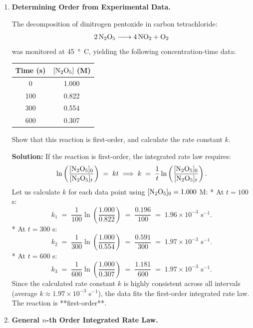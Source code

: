 \documentclass[12pt, a4paper]{book}
\begin{document}
\begin{problembox}
\begin{enumerate}[label=\textbf{E\arabic*.}]
  \item \textbf{Determining Order from Experimental Data.}
  
        The decomposition of dinitrogen pentoxide in carbon tetrachloride:
        \[
          \ce{2 N2O5 -> 4 NO2 + O2}
        \]
        was monitored at \SI{45}{\degree C}, yielding the following concentration-time data:
        \begin{center}
        \begin{tabular}{cc}
        \toprule
        \textbf{Time (s)} & \textbf{$[\ce{N2O5}]$ (M)} \\
        \midrule
        0 & 1.000 \\
        100 & 0.822 \\
        300 & 0.554 \\
        600 & 0.307 \\
        \bottomrule
        \end{tabular}
        \end{center}
        Show that this reaction is first-order, and calculate the rate constant $k$.
        
        \textbf{Solution:}
        If the reaction is first-order, the integrated rate law requires:
        \[
          \ln\left( \frac{[\ce{N2O5}]_0}{[\ce{N2O5}]_t} \right) \;=\; k t \implies k \;=\; \frac{1}{t} \ln\left( \frac{[\ce{N2O5}]_0}{[\ce{N2O5}]_t} \right).
        \]
        Let us calculate $k$ for each data point using $[\ce{N2O5}]_0 = 1.000$ M:
        * At $t = 100$ s:
        \[
          k_1 \;=\; \frac{1}{100} \ln\left( \frac{1.000}{0.822} \right) \;=\; \frac{0.196}{100} \;=\; 1.96 \times 10^{-3} \text{ s}^{-1}.
        \]
        * At $t = 300$ s:
        \[
          k_2 \;=\; \frac{1}{300} \ln\left( \frac{1.000}{0.554} \right) \;=\; \frac{0.591}{300} \;=\; 1.97 \times 10^{-3} \text{ s}^{-1}.
        \]
        * At $t = 600$ s:
        \[
          k_3 \;=\; \frac{1}{600} \ln\left( \frac{1.000}{0.307} \right) \;=\; \frac{1.181}{600} \;=\; 1.97 \times 10^{-3} \text{ s}^{-1}.
        \]
        Since the calculated rate constant $k$ is highly consistent across all intervals (average $k \approx 1.97 \times 10^{-3}$ s$^{-1}$), the data fits the first-order integrated rate law. The reaction is **first-order**.
        
  \item \textbf{General $n$-th Order Integrated Rate Law.}
  

\end{enumerate}
\end{problembox}
\end{document}
